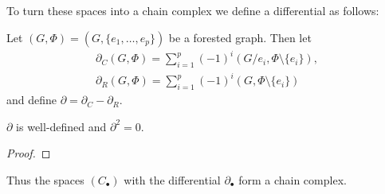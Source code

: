 To turn these spaces into a chain complex we define a differential as follows:
\begin{definition}
	Let $(G,\Phi) = (G, \{e_1,\ldots,e_{p}\} )$ be a forested graph. Then let
	\begin{align*}
		\partial_{C}(G,\Phi) = \sum_{i=1}^{p} (-1)^{i} (G / e_{i}, \Phi \setminus \{e_i\}),\\
		\partial _{R}(G,\Phi) = \sum_{i=1}^{p} (-1)^{i} (G,\Phi \setminus \{e_{i}\}) 
	\end{align*}
	and define $\partial = \partial_{C} - \partial_{R}$.
\end{definition}

\begin{proposition}
	$\partial$ is well-defined and $\partial^2 = 0$.
\end{proposition}

\begin{proof}
	
\end{proof}

Thus the spaces $(C_{\bullet})$ with the differential $\partial_{\bullet}$ form a chain complex.

\begin{eg}
	
\end{eg}

\printbibliography




